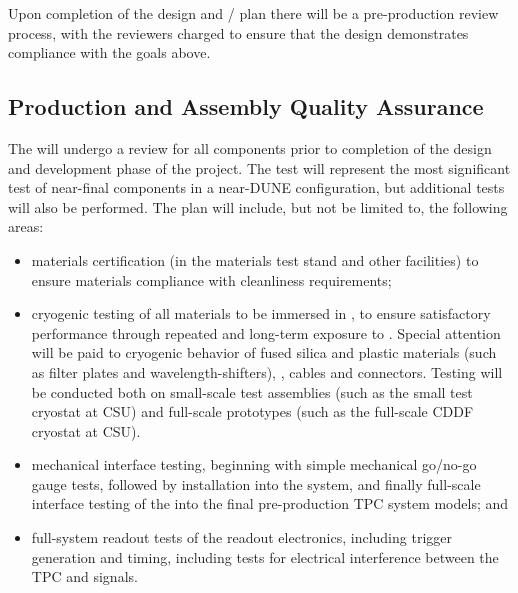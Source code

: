 Upon completion of the  design and / plan there will be a pre-production review process, with the reviewers charged to ensure that the design demonstrates compliance with the goals above.

\subsection{Production and Assembly Quality Assurance}
\label{sec:fdsp-pd-prodqa}

The  will undergo a  review for all components prior to completion of the design and development phase of the project.  The  test will represent the most significant test of near-final  components in a near-DUNE configuration, but additional tests will also be performed.  The  plan will include, but not be limited to, the following areas:

\begin{itemize}
\item materials certification (in the  materials test stand and other facilities) to ensure materials compliance with cleanliness requirements;
\item cryogenic testing of all materials to be immersed in \lar, to ensure satisfactory performance through repeated and long-term exposure to \lar{}.  Special attention will be paid to cryogenic behavior of fused silica and plastic materials (such as filter plates and wavelength-shifters), , cables and connectors.  Testing will be conducted both on small-scale test assemblies (such as the small test cryostat at CSU) and full-scale prototypes (such as the full-scale CDDF cryostat at CSU). 
\item mechanical interface testing, beginning with simple mechanical go/no-go gauge tests, followed by installation into the  system, and finally full-scale interface testing of the  into the final pre-production TPC system models; and
\item full-system readout tests of the  readout electronics, including trigger generation and timing, including tests for electrical interference between the TPC and  signals.
\end{itemize}


